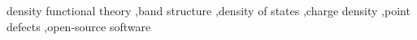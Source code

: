 density functional theory \sep band structure \sep density of states \sep charge density \sep point defects \sep open-source software
